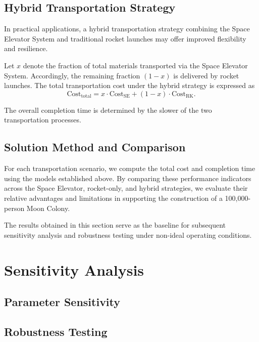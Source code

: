 \documentclass[demo]{mcmthesis}
\begin{document}
\subsection{Hybrid Transportation Strategy}
In practical applications, a hybrid transportation strategy combining the Space Elevator System and traditional rocket launches may offer improved flexibility and resilience.

Let $x$ denote the fraction of total materials transported via the Space Elevator System. 
Accordingly, the remaining fraction $(1-x)$ is delivered by rocket launches.
The total transportation cost under the hybrid strategy is expressed as
\begin{equation}
\text{Cost}_{\text{total}} = x \cdot \text{Cost}_{\text{SE}} + (1-x) \cdot \text{Cost}_{\text{RK}}.
\end{equation}

The overall completion time is determined by the slower of the two transportation processes.

\subsection{Solution Method and Comparison}
For each transportation scenario, we compute the total cost and completion time using the models established above. 
By comparing these performance indicators across the Space Elevator, rocket-only, and hybrid strategies, we evaluate their relative advantages and limitations in supporting the construction of a 100,000-person Moon Colony.

The results obtained in this section serve as the baseline for subsequent sensitivity analysis and robustness testing under non-ideal operating conditions.

\section{Sensitivity Analysis}

\subsection{Parameter Sensitivity}

\subsection{Robustness Testing}
\end{document}
